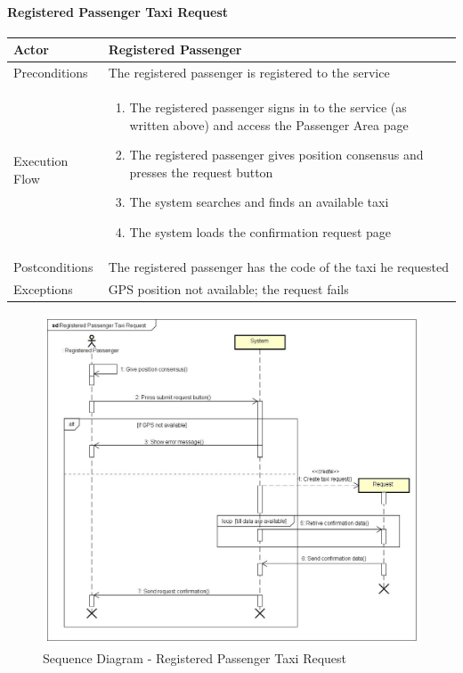 		\paragraph{Registered Passenger Taxi Request}
			\begin{center}
				\begin{tabular}{ | l | p{8cm} |}
					\hline
					Actor &  Registered Passenger	\\ \hline
					Preconditions & The registered passenger is registered to the service	\\ \hline
					Execution Flow & \begin{enumerate}
						\item The registered passenger signs in to the service (as written above) and access the Passenger Area page
						\item The registered passenger gives position consensus and presses the request button
						\item The system searches and finds an available taxi
						\item The system loads the confirmation request page
					\end{enumerate}		\\ \hline
					Postconditions & The registered passenger has the code of the taxi he requested	\\ \hline
					Exceptions & GPS position not available; the request fails \\ \hline
				\end{tabular}
			\end{center}
			\begin{figure}[!h]
				\begin{center}			
					\includegraphics[scale=0.4]{../SE2_SD/RegisteredPassengerTaxiRequest}
					\caption{Sequence Diagram - Registered Passenger Taxi Request}	
				\end{center}
			\end{figure}
